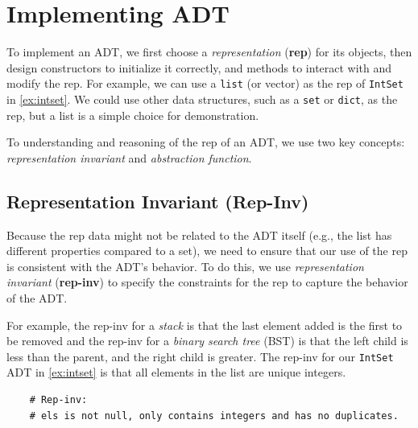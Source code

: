 \documentclass[oneside,11pt,dvipsnames]{book}
\newcommand{\code}[1]{\texttt{#1}}
\begin{document}

\section{Implementing ADT}\label{sec:implementing-adt}

To implement an ADT, we first choose a \emph{representation} (\textbf{rep}) for its objects, then design constructors to initialize it correctly, and methods to interact with and modify the rep. 
For example, we can use a \code{list} (or vector) as the rep of \code{IntSet} in \autoref{ex:intset}. We could use other data structures, such as a \code{set} or \code{dict}, as the rep, but a list is a simple choice for demonstration.


To understanding and reasoning of the rep of an ADT, we use two key concepts: \emph{representation invariant} and \emph{abstraction function}.

\subsection{Representation Invariant (Rep-Inv)}\label{sec:rep-invs}
Because the rep data might not be related to the ADT itself (e.g., the list has different properties compared to a set), we need to ensure that our use of the rep is consistent with the ADT's behavior. 
To do this, we use \emph{representation invariant} (\textbf{rep-inv}) to specify the constraints for the rep to capture the behavior of the ADT.


For example, the rep-inv for a \emph{stack} is that the last element added is the first to be removed and the rep-inv for a \emph{binary search tree} (BST) is that the left child is less than the parent, and the right child is greater. 
The rep-inv for our \code{IntSet} ADT in \autoref{ex:intset} is that all elements in the list are unique integers. 
\begin{lstlisting}
    # Rep-inv:
    # els is not null, only contains integers and has no duplicates.
\end{lstlisting}

\end{document}
